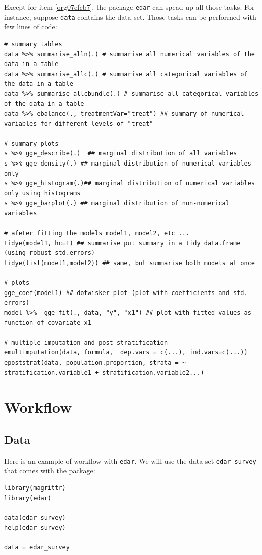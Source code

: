 \documentclass[a4paper]{article}
\begin{document}
Execpt for item \ref{org07efcb7}, the package \texttt{edar} can spead up all those tasks. For instance, suppose \texttt{data} contains the data set. Those tasks can be performed with few lines of code:

\lstset{numbers=left,language=r,label=orgaaa04a1,caption= ,captionpos=b}
\begin{lstlisting}
# summary tables
data %>% summarise_alln(.) # summarise all numerical variables of the data in a table
data %>% summarise_allc(.) # summarise all categorical variables of the data in a table 
data %>% summarise_allcbundle(.) # summarise all categorical variables of the data in a table
data %>% ebalance(., treatmentVar="treat") ## summary of numerical variables for different levels of "treat"

# summary plots
s %>% gge_describe(.)  ## marginal distribution of all variables
s %>% gge_density(.) ## marginal distribution of numerical variables only
s %>% gge_histogram(.)## marginal distribution of numerical variables only using histograms
s %>% gge_barplot(.) ## marginal distribution of non-numerical variables

# afeter fitting the models model1, model2, etc ...
tidye(model1, hc=T) ## summarise put summary in a tidy data.frame (using robust std.errors)
tidye(list(model1,model2)) ## same, but summarise both models at once

# plots
gge_coef(model1) ## dotwisker plot (plot with coefficients and std. errors)
model %>%  gge_fit(., data, "y", "x1") ## plot with fitted values as function of covariate x1

# multiple imputation and post-stratification
emultimputation(data, formula,  dep.vars = c(...), ind.vars=c(...)) 
epoststrat(data, population.proportion, strata = ~ stratification.variable1 + stratification.variable2...) 
\end{lstlisting}

\section{Workflow}
\label{sec:orgc103549}
\subsection{Data}
\label{sec:orgeeea783}
Here is an example of workflow with \texttt{edar}. We will use the data set \texttt{edar\_survey} that comes with the package:

\lstset{numbers=left,language=r,label=org10799eb,caption= ,captionpos=b}
\begin{lstlisting}
library(magrittr)
library(edar)

data(edar_survey)
help(edar_survey)

data = edar_survey
\end{lstlisting}
\end{document}
